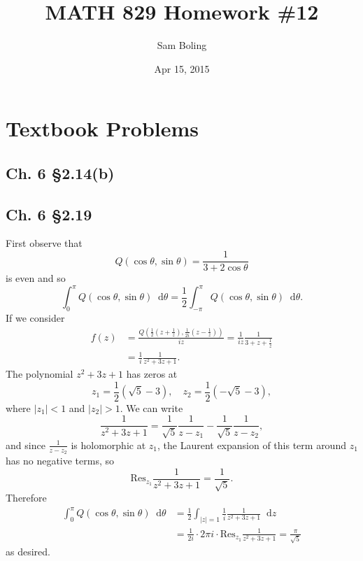 \documentclass{article}
\title{MATH 829 Homework \#12}
\date{Apr 15, 2015}
\author{Sam Boling}
\newcommand\Res{\mathrm{Res}}
\newcommand\dif{\mathop{}\!\mathrm{d}}
\newcounter{Problem}
\begin{document}
\begin{titlepage}
\maketitle
\end{titlepage}

\section{Textbook Problems}
\subsection{Ch. 6 \S 2.14(b)}

\subsection{Ch. 6 \S 2.19}
First observe that
$$
  Q(\cos \theta, \sin \theta)
= \frac{1}{3 + 2 \cos \theta}
$$
is even and so
$$
  \int_0^\pi
    Q(\cos \theta, \sin \theta)
    \dif \theta
= \frac{1}{2}
  \int_{-\pi}^{\pi}
    Q(\cos \theta, \sin \theta)
    \dif \theta.
$$
If we consider
\begin{align*}
   f(z)
&= \frac{
     Q
     \left(
       \frac{1}{2}
       \left(
         z + \frac{1}{z}
       \right),
       \frac{1}{2i}
       \left(
         z - \frac{1}{z}
       \right)
     \right)
   }
   {i z}
 = \frac{1}{iz}
   \frac{1}{3 + z + \frac{1}{z}} \\
&= \frac{1}{i}
   \frac{1}{z^2 + 3z + 1}.
\end{align*}
The polynomial $z^2 + 3z + 1$ has zeros at
$$
z_1 = \frac{1}{2}(\sqrt{5} - 3), \quad
z_2 = \frac{1}{2}(-\sqrt{5} - 3),
$$
where $|z_1| < 1$ and $|z_2| > 1$.
We can write
$$
  \frac{1}{z^2 + 3z + 1}
= \frac{1}{\sqrt{5}}
  \frac{1}{z - z_1}
- \frac{1}{\sqrt{5}}
  \frac{1}{z - z_2},
$$
and since $\frac{1}{z - z_2}$ is holomorphic
at $z_1$, the Laurent expansion of this term around
$z_1$ has no negative terms, so
$$
  \Res_{z_1}
    \frac{1}{z^2 + 3z + 1}
= \frac{1}{\sqrt{5}}.
$$
Therefore
\begin{align*}
   \int_0^\pi
     Q(\cos \theta, \sin \theta)
     \dif \theta
&= \frac{1}{2}
   \int_{|z| = 1}
     \frac{1}{i}
     \frac{1}{z^2 + 3z + 1}
     \dif z \\
&= \frac{1}{2i} \cdot
   2 \pi i \cdot
   \Res_{z_1}
     \frac{1}{z^2 + 3z + 1}
 = \frac{\pi}{\sqrt{5}}
\end{align*}
as desired.
\end{document}
